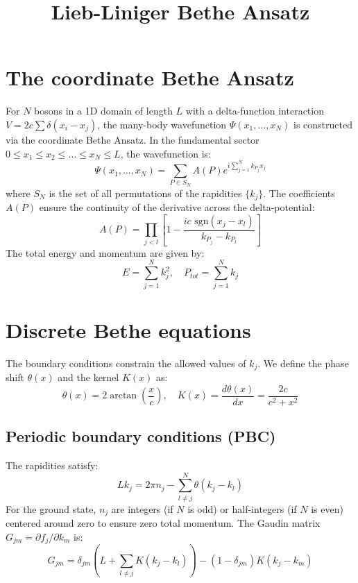 \documentclass[11pt]{article}
\title{Lieb-Liniger Bethe Ansatz}
\date{}
\begin{document}
\maketitle

\section{The coordinate Bethe Ansatz}
For $N$ bosons in a 1D domain of length $L$ with a delta-function interaction $V = 2c \sum \delta(x_i - x_j)$, the many-body wavefunction $\Psi(x_1, \dots, x_N)$ is constructed via the coordinate Bethe Ansatz. In the fundamental sector $0 \le x_1 \le x_2 \le \dots \le x_N \le L$, the wavefunction is:
\begin{equation}
    \Psi(x_1, \dots, x_N) = \sum_{P \in S_N} A(P) e^{i \sum_{j=1}^N k_{P_j} x_j}
\end{equation}
where $S_N$ is the set of all permutations of the rapidities $\{k_j\}$. The coefficients $A(P)$ ensure the continuity of the derivative across the delta-potential:
\begin{equation}
    A(P) = \prod_{j<l} \left[ 1 - \frac{ic \text{ sgn}(x_j - x_l)}{k_{P_j} - k_{P_l}} \right]
\end{equation}
The total energy and momentum are given by:
\begin{equation}
    E = \sum_{j=1}^N k_j^2, \quad P_{tot} = \sum_{j=1}^N k_j
\end{equation}

\section{Discrete Bethe equations}
The boundary conditions constrain the allowed values of $k_j$. We define the phase shift $\theta(x)$ and the kernel $K(x)$ as:
\begin{equation}
    \theta(x) = 2 \arctan\left(\frac{x}{c}\right), \quad K(x) = \frac{d\theta(x)}{dx} = \frac{2c}{c^2 + x^2}
\end{equation}

\subsection{Periodic boundary conditions (PBC)}
The rapidities satisfy\cite{Oelkers_2006}:
\begin{equation}
    Lk_j = 2\pi n_j - \sum_{l \neq j}^N \theta(k_j - k_l)
\end{equation}
For the ground state, $n_j$ are integers (if $N$ is odd) or half-integers (if $N$ is even) centered around zero to ensure zero total momentum. The Gaudin matrix $G_{jm} = \partial f_j / \partial k_m$ is:
\begin{equation}
    G_{jm} = \delta_{jm} \left( L + \sum_{l \neq j} K(k_j - k_l) \right) - (1 - \delta_{jm}) K(k_j - k_m)
\end{equation}
\end{document}
